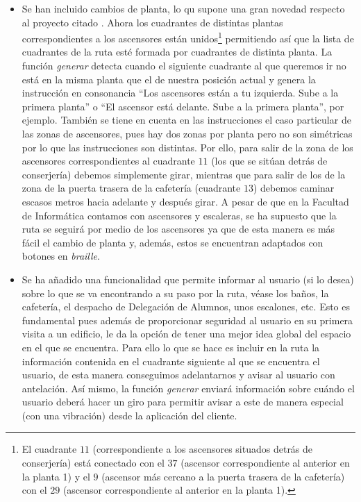 \begin{itemize}
	
	\item Se han incluido cambios de planta, lo qu supone una gran novedad respecto al proyecto citado \cite{TFGguia}. Ahora los cuadrantes de distintas plantas correspondientes a los ascensores están unidos\footnote{El cuadrante $11$ (correspondiente a los ascensores situados detrás de conserjería) está conectado con el $37$ (ascensor correspondiente al anterior en la planta 1) y el $9$ (ascensor más cercano a la puerta trasera de la cafetería) con el $29$ (ascensor correspondiente al anterior en la planta 1).} permitiendo así que la lista de cuadrantes de la ruta esté formada por cuadrantes de distinta planta. La función \textit{generar} detecta cuando el siguiente cuadrante al que queremos ir no está en la misma planta que el de nuestra posición actual y genera la instrucción en consonancia ``Los ascensores están a tu izquierda. Sube a la primera planta'' o ``El ascensor está delante. Sube a la primera planta'', por ejemplo. También se tiene en cuenta en las instrucciones el caso particular de las zonas de ascensores, pues hay dos zonas por planta pero no son simétricas por lo que las instrucciones son distintas. Por ello, para salir de la zona de los ascensores correspondientes al cuadrante $11$ (los que se sitúan detrás de conserjería) debemos simplemente girar, mientras que para salir de los de la zona de la puerta trasera de la cafetería (cuadrante $13$) debemos caminar escasos metros hacia adelante y después girar. A pesar de que en la Facultad de Informática contamos con ascensores y escaleras, se ha supuesto que la ruta se seguirá por medio de los ascensores ya que de esta manera es más fácil el cambio de planta y, además, estos se encuentran adaptados con botones en \textit{braille}.
	
	\item Se ha añadido una funcionalidad que permite informar al usuario (si lo desea) sobre lo que se va encontrando a su paso por la ruta, véase los baños, la cafetería, el despacho de Delegación de Alumnos, unos escalones, etc. Esto es fundamental pues además de proporcionar seguridad al usuario en su primera visita a un edificio, le da la opción de tener una mejor idea global del espacio en el que se encuentra. Para ello lo que se hace es incluir en la ruta la información contenida en el cuadrante siguiente al que se encuentra el usuario, de esta manera conseguimos adelantarnos y avisar al usuario con antelación. Así mismo, la función \textit{generar} enviará información sobre cuándo el usuario deberá hacer un giro para permitir avisar a este de manera especial (con una vibración) desde la aplicación del cliente.
	
\end{itemize}

